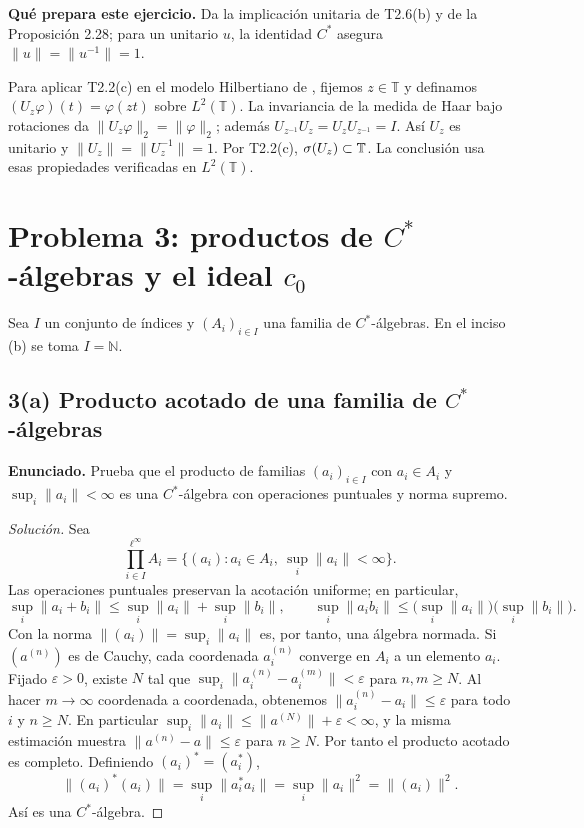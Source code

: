 \noindent\textbf{Qué prepara este ejercicio.} Da la implicación unitaria de T2.6(b) y de la Proposición 2.28; para un unitario $u$, la identidad $C^*$ asegura $\|u\|=\|u^{-1}\|=1$.

\begin{investigacion}[title={Rotaciones unitarias en $L^2(\mathbb T)$}]
Para aplicar T2.2(c) en el modelo Hilbertiano de \cite{BFK2006}, fijemos $z\in\mathbb T$ y
definamos $(U_z\varphi)(t)=\varphi(zt)$ sobre $L^2(\mathbb T)$.
La invariancia de la medida de Haar bajo rotaciones da $\|U_z\varphi\|_2=\|\varphi\|_2$;
además $U_{z^{-1}}U_z=U_zU_{z^{-1}}=I$. Así $U_z$ es unitario y
$\|U_z\|=\|U_z^{-1}\|=1$.
Por T2.2(c), $\sigma(U_z)\subset\mathbb T$. La conclusión usa esas propiedades
verificadas en $L^2(\mathbb T)$.
\end{investigacion}

\pagebreak
\section{Problema 3: productos de $C^*$-álgebras y el ideal $c_0$}

Sea $I$ un conjunto de índices y $(A_i)_{i\in I}$ una familia de $C^*$-álgebras. En el inciso
(b) se toma $I=\mathbb N$.

\subsection*{3(a) Producto acotado de una familia de $C^*$-álgebras}

\noindent\textbf{Enunciado.} Prueba que el producto de familias $(a_i)_{i\in I}$ con $a_i\in A_i$ y $\sup_i\|a_i\|<\infty$ es una $C^*$-álgebra con operaciones puntuales y norma supremo.

\begin{proof}[Solución]
Sea
\[
\prod_{i\in I}^{\ell^\infty} A_i
=\{(a_i): a_i\in A_i,\ \sup_i\|a_i\|<\infty\}.
\]
Las operaciones puntuales preservan la acotación uniforme; en particular,
\[
 \sup_i\|a_i+b_i\|\le\sup_i\|a_i\|+\sup_i\|b_i\|,
 \qquad
 \sup_i\|a_ib_i\|\le\bigl(\sup_i\|a_i\|\bigr)
                        \bigl(\sup_i\|b_i\|\bigr).
\]
Con la norma $\|(a_i)\|=\sup_i\|a_i\|$ es, por tanto, una álgebra normada. Si
$(a^{(n)})$ es de Cauchy, cada coordenada $a_i^{(n)}$ converge en $A_i$ a un elemento $a_i$.
Fijado $\varepsilon>0$, existe $N$ tal que
$\sup_i\|a_i^{(n)}-a_i^{(m)}\|<\varepsilon$ para $n,m\ge N$. Al hacer $m\to\infty$
coordenada a coordenada, obtenemos $\|a_i^{(n)}-a_i\|\le\varepsilon$ para todo $i$ y $n\ge N$.
En particular $\sup_i\|a_i\|\le\|a^{(N)}\|+\varepsilon<\infty$, y la misma estimación muestra
$\|a^{(n)}-a\|\le\varepsilon$ para $n\ge N$. Por tanto el producto acotado es completo.
Definiendo $(a_i)^*=(a_i^*)$,
\[
\|(a_i)^*(a_i)\|
=\sup_i\|a_i^*a_i\|
=\sup_i\|a_i\|^2
=\|(a_i)\|^2.
\]
Así es una $C^*$-álgebra.
\end{proof}

